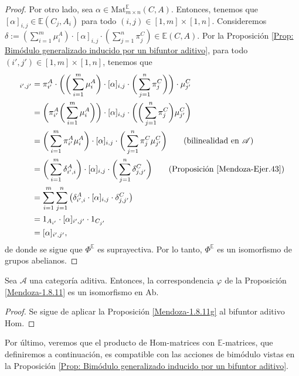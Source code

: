 \documentclass[tesis]{subfiles}
\begin{document}
\begin{proof}
    Por otro lado, sea $\alpha\in\text{Mat}^\mathbb{E}_{m\times n}(C,A)$. Entonces, tenemos que $[\alpha]_{i,j}\in\mathbb{E}(C_j,A_i)$ para todo $(i,j)\in[1,m]\times[1,n]$. Consideremos $\delta:=(\sum_{i=1}^m\mu_i^A)\cdot[\alpha]_{i,j}\cdot(\sum_{j=1}^n\pi_j^C)\in\mathbb{E}(C,A)$. Por la Proposición \ref{Prop: Bimódulo generalizado inducido por un bifuntor aditivo}, para todo $(i',j')\in[1,m]\times[1,n]$, tenemos que
    \begin{align*}
        [\Phi^\mathbb{E}(\delta)]_{i',j'} &= \pi_{i'}^A\cdot\bigg(\bigg(\sum_{i=1}^m\mu_i^A\bigg)\cdot[\alpha]_{i,j}\cdot\bigg(\sum_{j=1}^n\pi_j^C\bigg)\bigg)\cdot\mu_{j'}^C \\
                                          &=  \bigg(\pi_{i'}^A\bigg(\sum_{i=1}^m\mu_i^A\bigg)\bigg) \cdot[\alpha]_{i,j}\cdot\bigg(\bigg(\sum_{j=1}^n\pi_j^C\bigg)\mu_{j'}^C\bigg) \\
                                          &= \bigg(\sum_{i=1}^m\pi_{i'}^A\mu_i^A\bigg)\cdot[\alpha]_{i,j}\cdot\bigg(\sum_{j=1}^n\pi_j^C\mu_{j'}^C\bigg) \tag{bilinealidad en $\mathscr{A}$} \\
                                          &= \bigg( \sum_{i=1}^m \delta^A_{i',i} \bigg) \cdot[\alpha]_{i,j}\cdot \bigg( \sum_{j=1}^n \delta^C_{j,j'} \bigg) \tag{Proposición \ref{Mendoza-Ejer.43}} \\
                                          &= \sum_{i=1}^m \sum_{j=1}^n \big(\delta^A_{i',i}\cdot[\alpha]_{i,j}\cdot\delta^C_{j,j'}\big) \\
                                          &= 1_{A_{i'}}\cdot[\alpha]_{i',j'}\cdot1_{C_{j'}} \\
                                          &= [\alpha]_{i',j'},
    \end{align*}
    de donde se sigue que $\Phi^\mathbb{E}$ es suprayectiva. Por lo tanto, $\Phi^\mathbb{E}$ es un isomorfismo de grupos abelianos.
\end{proof}

\begin{Coro}
    Sea $\mathscr{A}$ una categoría aditiva. Entonces, la correspondencia $\varphi$ de la Proposición \ref{Mendoza-1.8.11} es un isomorfismo en Ab. 
\end{Coro}

\begin{proof}
    Se sigue de aplicar la Proposición \ref{Mendoza-1.8.11g} al bifuntor aditivo Hom.
\end{proof}

Por último, veremos que el producto de Hom-matrices con $\mathbb{E}$-matrices, que definiremos a continuación, es compatible con las acciones de bimódulo vistas en la Proposición \ref{Prop: Bimódulo generalizado inducido por un bifuntor aditivo}.
\end{document}
